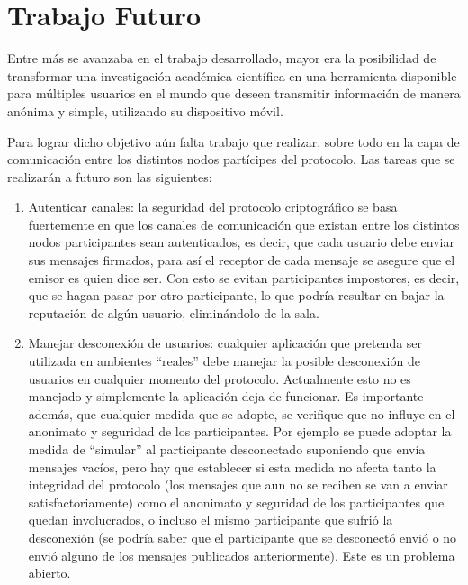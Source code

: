 \chapter{Trabajo Futuro}\label{cap6}

Entre más se avanzaba en el trabajo desarrollado, mayor era la posibilidad de transformar
una investigación académica-científica en una herramienta disponible para múltiples
usuarios en el mundo que deseen transmitir información de manera anónima y simple, 
utilizando su dispositivo móvil.

Para lograr dicho objetivo aún falta trabajo que realizar, sobre todo en la capa de
comunicación entre los distintos nodos partícipes del protocolo. Las tareas que se
realizarán a futuro son las siguientes:

\begin{enumerate}
    \item Autenticar canales: la seguridad del protocolo criptográfico se basa fuertemente
    en que los canales de comunicación que existan entre los distintos nodos participantes
    sean autenticados, es decir, que cada usuario debe enviar sus mensajes firmados, para
    así el receptor de cada mensaje se asegure que el emisor es quien dice ser. Con esto
    se evitan participantes impostores, es decir, que se hagan pasar por otro 
    participante, lo que podría resultar en bajar la reputación de algún usuario,
    eliminándolo de la sala.
    
    \item Manejar desconexión de usuarios: cualquier aplicación que pretenda ser utilizada
    en ambientes ``reales'' debe manejar la posible desconexión de usuarios en cualquier 
    momento del protocolo. Actualmente esto no es manejado y simplemente la aplicación 
    deja de funcionar. Es importante además, que cualquier medida que se adopte, se 
    verifique que no influye en el anonimato y seguridad de los participantes. Por 
    ejemplo se puede adoptar la medida de ``simular'' al participante desconectado 
    suponiendo que envía mensajes vacíos, pero hay que establecer si esta medida no 
    afecta tanto la integridad del protocolo (los mensajes que aun no se reciben 
    se van a enviar satisfactoriamente) como el anonimato y seguridad de los 
    participantes que quedan involucrados, o incluso el mismo participante que sufrió 
    la desconexión (se podría saber que el participante que se desconectó envió o no 
    envió alguno de los mensajes publicados anteriormente). Este es un problema abierto.
    

\end{enumerate}

